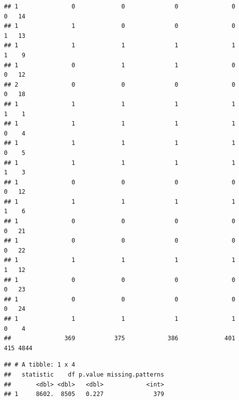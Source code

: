 \documentclass[
]{article}
\begin{document}
\begin{verbatim}
## 1               0             0              0               0           0   14
## 1               1             0              0               0           1   13
## 1               1             1              1               1           1    9
## 1               0             1              1               0           0   12
## 2               0             0              0               0           0   18
## 1               1             1              1               1           1    1
## 1               1             1              1               1           0    4
## 1               1             1              1               1           0    5
## 1               1             1              1               1           1    3
## 1               0             0              0               0           0   12
## 1               1             1              1               1           1    6
## 1               0             0              0               0           0   21
## 1               0             0              0               0           0   22
## 1               1             1              1               1           1   12
## 1               0             0              0               0           0   23
## 1               0             0              0               0           0   24
## 1               1             1              1               1           0    4
##               369           375            386             401         415 4844
\end{verbatim}

\begin{verbatim}
## # A tibble: 1 x 4
##   statistic    df p.value missing.patterns
##       <dbl> <dbl>   <dbl>            <int>
## 1     8602.  8505   0.227              379
\end{verbatim}
\end{document}
